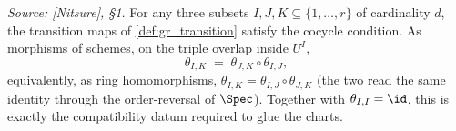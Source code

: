 \begin{lemma}

  \label{lem:gr_cocycle}
  \textit{Source: [Nitsure], \S 1.}
  For any three subsets \(I, J, K \subseteq \{1, \dots, r\}\) of cardinality
  \(d\), the transition maps of \cref{def:gr_transition} satisfy the cocycle
  condition. As morphisms of schemes, on the triple overlap inside \(U^I\),
  \[
    \theta_{I,K} \;=\; \theta_{J,K} \circ \theta_{I,J},
  \]
  equivalently, as ring homomorphisms,
  \(\theta_{I,K} = \theta_{I,J} \circ \theta_{J,K}\) (the two read the same
  identity through the order-reversal of \(\Spec\)). Together with
  \(\theta_{I,I} = \id\), this is exactly the compatibility datum required to
  glue the charts.
\end{lemma}

